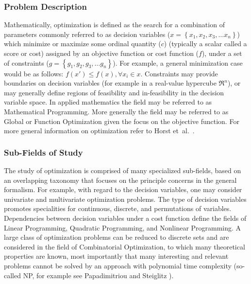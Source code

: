 \begin{bibunit}
%
%
\subsubsection{Problem Description}
Mathematically, optimization is defined as the search for a combination of parameters commonly referred to as decision variables ($x = \left\{x_1, x_2, x_3, \ldots x_n\right\}$) which minimize or maximize some ordinal quantity ($c$) (typically a scalar  called a score or cost) assigned by an objective function or cost function ($f$), under a set of constraints ($g = \left\{g_1, g_2, g_3, \ldots g_n\right\}$). For example, a general minimization case would be as follows: $f(x') \leq f(x), \forall x_i \in x$. Constraints may provide boundaries on decision variables (for example in a real-value hypercube $\Re^n$), or may generally define regions of feasibility and in-feasibility in the decision variable space. In applied mathematics the field may be referred to as Mathematical Programming. More generally the field may be referred to as Global or Function Optimization given the focus on the objective function. For more general information on optimization refer to Horst et~al.\ \cite{Horst2000}. 

%
%
\subsubsection{Sub-Fields of Study}
The study of optimization is comprised of many specialized sub-fields, based on an overlapping taxonomy that focuses on the principle concerns in the general formalism. 
For example, with regard to the decision variables, one may consider univariate and multivariate optimization problems. The type of decision variables promotes specialities for continuous, discrete, and permutations of variables. Dependencies between decision variables under a cost function define the fields of Linear Programming, Quadratic Programming, and Nonlinear Programming. A large class of optimization problems can be reduced to discrete sets and are considered in the field of Combinatorial Optimization, to which many theoretical properties are known, most importantly that many interesting and relevant problems cannot be solved by an approach with polynomial time complexity (so-called NP, for example see Papadimitriou and Steiglitz \cite{Papadimitriou1998}).


\end{bibunit}
